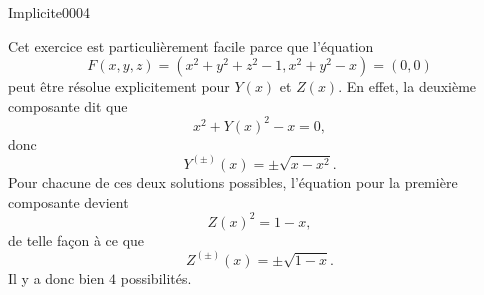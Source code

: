 
\begin{corrige}{Implicite0004}

	Cet exercice est particulièrement facile parce que l'équation
	\begin{equation}
		F(x,y,z)=(x^2+y^2+z^2-1,x^2+y^2-x)=(0,0)
	\end{equation}
	peut être résolue explicitement pour $Y(x)$ et $Z(x)$. En effet, la deuxième composante dit que
	\begin{equation}
		x^2+Y(x)^2-x=0,
	\end{equation}
	donc
	\begin{equation}
		Y^{(\pm)}(x)=\pm\sqrt{x-x^2}.
	\end{equation}
	Pour chacune de ces deux solutions possibles, l'équation pour la première composante devient
	\begin{equation}
		Z(x)^2=1-x,
	\end{equation}
	de telle façon à ce que
	\begin{equation}
		Z^{(\pm)}(x)=\pm\sqrt{1-x}.
	\end{equation}
	Il y a donc bien $4$ possibilités.

\end{corrige}
